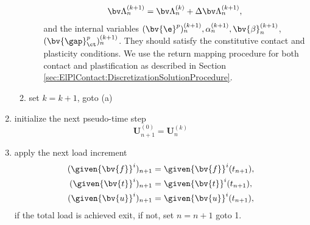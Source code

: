 \begin{enumerate}
\begin{enumerate}
\begin{enumerate}
\begin{equation*}
\begin{array}{c}
        \bv \Lambda^{(k+1)}_{n} = \bv \Lambda^{(k)}_{n} + \Delta \bv \Lambda^{(k+1)}_{n},
      \end{array}
      \end{equation*}
      and the internal variables $(\bv{\e}^p)^{(k+1)}_{n}, \alpha^{(k+1)}_{n}, \bv{\beta}^{(k+1)}_{n} $,
      $(\bv{\gap}^p_{\ct})^{(k+1)}_{n}$. 
      They should satisfy the constitutive contact and plasticity conditions. 
      We use the return mapping procedure for both contact and plastification as described in Section \ref{sec:ElPlContact:DiscretizationSolutionProcedure}.
    \end{enumerate}
    \item set $k=k+1$, goto (a)
  \end{enumerate}
  \item initialize the next pseudo-time step
  \[
     \mathbf{U}^{(0)}_{n+1} = \mathbf{U}^{(k)}_{n}
  \]
  \item apply the next load increment
    \begin{align*}
    (\given{\bv{f}}^i)_{n+1} &= \given{\bv{f}}^i(t_{n+1}), \\
    (\given{\bv{t}}^i)_{n+1} &= \given{\bv{t}}^i(t_{n+1}),\\
    (\given{\bv{u}}^i)_{n+1} &= \given{\bv{u}}^i(t_{n+1}),
    \end{align*}
  if the total load is achieved exit, if not, set $n=n+1$ goto 1.
\end{enumerate}


